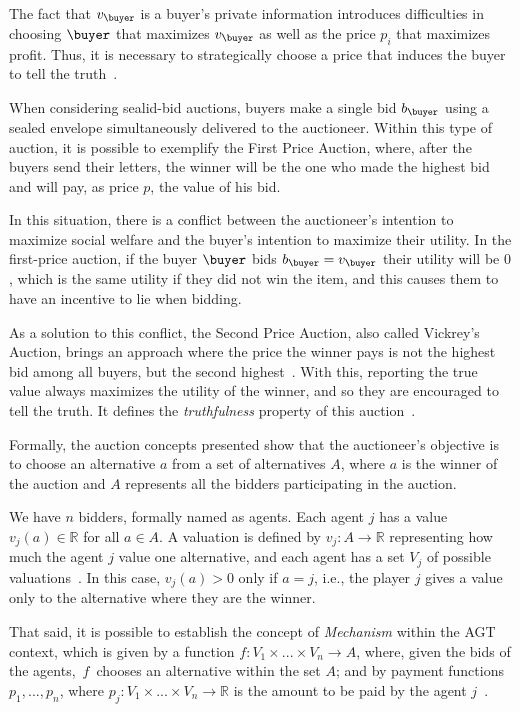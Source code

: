 \documentclass[English]{ic-tese-v3}
\begin{document}
The fact that $v_{\buyer}$ is a buyer's private information introduces difficulties in choosing $\buyer$ that maximizes $v_{\buyer}$ as well as the price $p_i$ that maximizes profit. Thus, it is necessary to strategically choose a price that induces the buyer to tell the truth~\cite{RafaelAGT2015}.

When considering sealid-bid auctions, buyers make a single bid $b_{\buyer}$ using a sealed envelope simultaneously delivered to the auctioneer. Within this type of auction, it is possible to exemplify the First Price Auction, where, after the buyers send their letters, the winner will be the one who made the highest bid and will pay, as price $p$, the value of his bid.

In this situation, there is a conflict between the auctioneer's intention to maximize social welfare and the buyer's intention to maximize their utility. In the first-price auction, if the buyer ${\buyer}$ bids $b_{\buyer} = v_{\buyer}$ their utility will be $0$, which is the same utility if they did not win the item, and this causes them to have an incentive to lie when bidding.

As a solution to this conflict, the Second Price Auction, also called Vickrey's Auction, brings an approach where the price the winner pays is not the highest bid among all buyers, but the second highest~\cite{Vic61}. With this, reporting the true value always maximizes the utility of the winner, and so they are encouraged to tell the truth. It defines the \emph{truthfulness} property of this auction~\cite{RafaelAGT2015}.

Formally, the auction concepts presented show that the auctioneer's objective is to choose an alternative $a$ from a set of alternatives $A$, where $a$ is the winner of the auction and $A$ represents all the bidders participating in the auction.

We have $n$ bidders, formally named as agents. Each agent $j$ has a value $v_j(a) \in \mathbb{R}$ for all $a \in A$. A valuation is defined by $v_j : A \rightarrow \mathbb{R}$ representing how much the agent $j$ value one alternative, and each agent has a set $V_j$ of possible valuations~\cite{RafaelAGT2015}. In this case, $v_j(a) > 0$ only if $a = j$, i.e., the player $j$ gives a value only to the alternative where they are the winner.

That said, it is possible to establish the concept of \emph{Mechanism} within the AGT context, which is given by a function $f : V_1 \times ... \times V_n \rightarrow A$, where, given the bids of the agents,~$f$~chooses an alternative within the set $A$; and by payment functions $p_1, ..., p_n$, where $p_j : V_1 \times ... \times V_n \rightarrow \mathbb{R}$ is the amount to be paid by the agent $j$~\cite{ TimAGT2007, RafaelAGT2015}.
\end{document}
